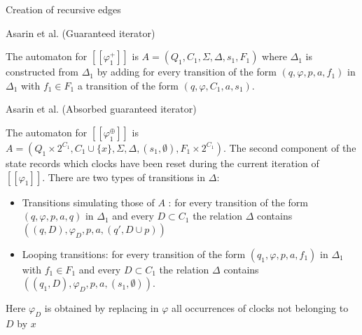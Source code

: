 \begin{frame}[fragile,shrink=5]{Creation of recursive edges}
    \begin{definition}Asarin et al. (Guaranteed iterator)

        The automaton for $[\![\varphi^+_1 ]\!]$ is $A = (Q_1,C_1,\Sigma,\Delta,s_1,F_1)$ where $\Delta_1$ is constructed from $\Delta_1$ by adding
        for every transition of the form $(q,\varphi,p,a, f_1)$ in $\Delta_1$ with $f_1 \in F_1$ a transition of the form
        $(q,\varphi,C_1,a,s_1)$.
    \end{definition}
        
    \begin{definition}
        Asarin et al. (Absorbed guaranteed iterator)

        The automaton for $[\![\varphi^\oplus_1 ]\!]$ is $A = (Q_1 \times 2^{C_1}, C_1 \cup \{x\},\Sigma,\Delta,(s_1,\emptyset),F_1 \times 2^{C_1})$. The second component of the state records which clocks have been reset during the current iteration of $[\![\varphi_1]\!]$.
        There are two types of transitions in $\Delta$:
        \begin{itemize}
            \item Transitions simulating those of $A$ : for every transition of the form $(q,\varphi,p,a,q)$ in $\Delta_1$
            and every $D \subset C_1$ the relation $\Delta$ contains $((q,D),\varphi_D,p,a,(q',D\cup p))$
            \item Looping transitions: for every transition of the form $(q_1,\varphi,p,a, f_1)$ in $\Delta_1$ with $f_1 \in F_1$ and
            every $D \subset C_1$ the relation $\Delta$ contains $((q_1,D),\varphi_D,p,a,(s_1,\emptyset))$.
        \end{itemize}
        Here $\varphi_D$ is obtained by replacing in $\varphi$ all occurrences of clocks not belonging to $D$ by $x$
    \end{definition}
\end{frame}
    
